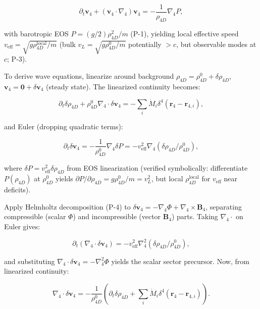 \begin{equation}
\partial_t \mathbf{v}_4 + (\mathbf{v}_4 \cdot \nabla_4) \mathbf{v}_4 = -\frac{1}{\rho_{4D}} \nabla_4 P,
\end{equation}

with barotropic EOS $P = (g/2) \rho_{4D}^2 / m$ (P-1), yielding local effective speed $v_{\text{eff}} = \sqrt{g \rho_{4D}^{\text{local}} / m}$ (bulk $v_L = \sqrt{g \rho_{4D}^0 / m}$ potentially $>c$, but observable modes at $c$; P-3).

To derive wave equations, linearize around background $\rho_{4D} = \rho_{4D}^0 + \delta \rho_{4D}$, $\mathbf{v}_4 = \mathbf{0} + \delta \mathbf{v}_4$ (steady state). The linearized continuity becomes:

\begin{equation}
\partial_t \delta \rho_{4D} + \rho_{4D}^0 \nabla_4 \cdot \delta \mathbf{v}_4 = -\sum_i \dot{M}_i \delta^4(\mathbf{r}_4 - \mathbf{r}_{4,i}),
\end{equation}

and Euler (dropping quadratic terms):

\begin{equation}
\partial_t \delta \mathbf{v}_4 = -\frac{1}{\rho_{4D}^0} \nabla_4 \delta P = -v_{\text{eff}}^2 \nabla_4 (\delta \rho_{4D} / \rho_{4D}^0),
\end{equation}

where $\delta P = v_{\text{eff}}^2 \delta \rho_{4D}$ from EOS linearization (verified symbolically: differentiate $P(\rho_{4D})$ at $\rho_{4D}^0$ yields $\partial P / \partial \rho_{4D} = g \rho_{4D}^0 / m = v_L^2$, but local $\rho_{4D}^{\text{local}}$ for $v_{\text{eff}}$ near deficits).

Apply Helmholtz decomposition (P-4) to $\delta \mathbf{v}_4 = -\nabla_4 \Phi + \nabla_4 \times \mathbf{B}_4$, separating compressible (scalar $\Phi$) and incompressible (vector $\mathbf{B}_4$) parts. Taking $\nabla_4 \cdot$ on Euler gives:

\begin{equation}
\partial_t (\nabla_4 \cdot \delta \mathbf{v}_4) = -v_{\text{eff}}^2 \nabla_4^2 (\delta \rho_{4D} / \rho_{4D}^0),
\end{equation}

and substituting $\nabla_4 \cdot \delta \mathbf{v}_4 = -\nabla_4^2 \Phi$ yields the scalar sector precursor. Now, from linearized continuity:

\begin{equation}
\nabla_4 \cdot \delta \mathbf{v}_4 = -\frac{1}{\rho_{4D}^0} \left( \partial_t \delta \rho_{4D} + \sum_i \dot{M}_i \delta^4(\mathbf{r}_4 - \mathbf{r}_{4,i}) \right).
\end{equation}

